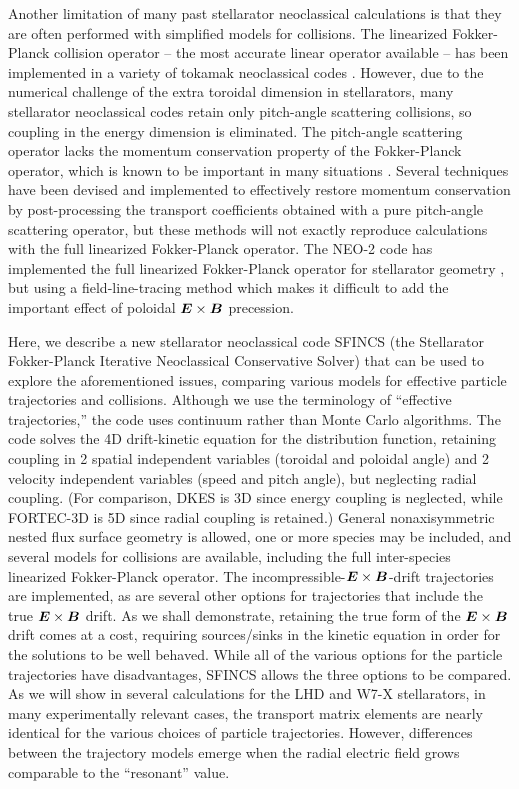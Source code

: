 \documentclass[12pt]{revtex4}
\newcommand{\vect}[1]{\mbox{\boldmath $#1$}}
\begin{document}
Another limitation of many past stellarator neoclassical calculations
is that they are often performed with simplified models for collisions.
The linearized Fokker-Planck collision operator -- the most accurate linear operator available -- 
has been implemented in a variety of 
tokamak neoclassical codes \cite{Sauter0, Sauter, WongChan, NEOFP, speedGrids}.
However, due to the numerical challenge of the extra toroidal dimension in stellarators, 
many stellarator neoclassical codes retain only pitch-angle scattering collisions,
so coupling in the energy dimension is eliminated.
The pitch-angle scattering operator
lacks the momentum conservation property of the Fokker-Planck operator,
which is known to be important in many situations \cite{Briesemeister}.
Several techniques have been devised and implemented \cite{Taguchi2, SugamaNishimura, Maassberg, PENTA}
to effectively restore momentum conservation by post-processing
the transport coefficients obtained with a pure pitch-angle scattering operator,
but these methods will not exactly reproduce calculations with the full linearized Fokker-Planck operator.
The NEO-2 code has implemented the full linearized Fokker-Planck operator for
stellarator geometry \cite{Kernbichler1}, but using a field-line-tracing method
which makes it difficult to add the important effect of poloidal $\vect{E}\times\vect{B}$ precession.

Here, we describe a new stellarator neoclassical code
SFINCS (the Stellarator Fokker-Planck Iterative Neoclassical Conservative Solver)
that can be used to explore the aforementioned issues,
comparing various models for effective particle trajectories and collisions.
Although we use the terminology of ``effective trajectories,'' the code
uses continuum rather than Monte Carlo algorithms.
The code solves the 4D drift-kinetic equation for the distribution function,
retaining coupling in 2 spatial independent variables (toroidal and poloidal angle)
and 2 velocity independent variables (speed and pitch angle),
but neglecting radial coupling.
(For comparison, DKES \cite{DKES1, DKES2} is 3D since energy coupling is neglected, 
while FORTEC-3D \cite{FORTEC_PFR, FORTEC_CPC} is 5D since
radial coupling is retained.)
General nonaxisymmetric nested flux surface geometry is allowed,
one or more species may be included, and several models for collisions are available,
including the full inter-species linearized Fokker-Planck operator.
The incompressible-$\vect{E}\times\vect{B}$-drift trajectories are implemented,
as are several other options for trajectories that include the true $\vect{E}\times\vect{B}$ drift.
As we shall demonstrate, retaining the true form of the $\vect{E}\times\vect{B}$
drift comes at a cost, requiring sources/sinks in the kinetic equation
in order for the solutions to be well behaved.
While all of the various options for the particle trajectories have disadvantages,
SFINCS allows the three options to be compared.
As we will show in several calculations for the LHD and W7-X stellarators,
in many experimentally relevant cases,
the transport matrix elements are nearly identical for the various choices of particle trajectories.
However, differences between the trajectory models emerge when the radial electric field
grows comparable to the ``resonant'' value.
\end{document}
